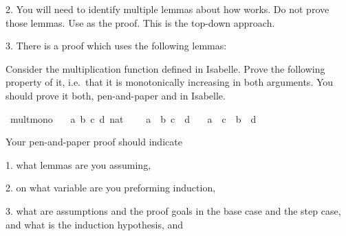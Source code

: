 \begin{isabellebody}
\begin{isamarkuptext}
 2. You will need to identify multiple lemmas about how  works. Do not prove those lemmas. Use 
     as the proof. This is the top-down approach. 

 3. There is a proof which uses the following lemmas:

\end{isamarkuptext}\isamarkuptrue%
%
\isadelimproof
%
\endisadelimproof
%
\isatagproof
%
\endisatagproof
{\isafoldproof}%
%
\isadelimproof
%
\endisadelimproof
%
\begin{isamarkuptext}%
%
\end{isamarkuptext}\isamarkuptrue%
%
\begin{isamarkuptext}%
Consider the multiplication function \isa{{\isacharparenleft}{\kern0pt}{\isacharasterisk}{\kern0pt}{\isacharparenright}{\kern0pt}} defined in Isabelle. Prove the following
      property of it, i.e.\ that it is monotonically increasing in both arguments. You should prove
      it both, pen-and-paper and in Isabelle.%
\end{isamarkuptext}\isamarkuptrue%
\isamarkupfalse%
\ mult{\isacharunderscore}{\kern0pt}mono{\isacharcolon}{\kern0pt}\isanewline
\ \ \ a\ b\ c\ d{\isacharcolon}{\kern0pt}{\isacharcolon}{\kern0pt}\ nat\ %
\isanewline
\ \ \ {\isachardoublequoteopen}a\ {\isasymle}\ b{\isachardoublequoteclose}\ {\isachardoublequoteopen}c\ {\isasymle}\ d{\isachardoublequoteclose}\isanewline
\ \ \ {\isachardoublequoteopen}a\ {\isacharasterisk}{\kern0pt}\ c\ {\isasymle}\ b\ {\isacharasterisk}{\kern0pt}\ d{\isachardoublequoteclose}%
\begin{isamarkuptext}%
Your pen-and-paper proof should indicate

 1. what lemmas are you assuming,

 2. on what variable are you preforming induction,

 3. what are assumptions and the proof goals in the base case and the step case, and what is the
    induction hypothesis, and


\end{isamarkuptext}
\end{isabellebody}
